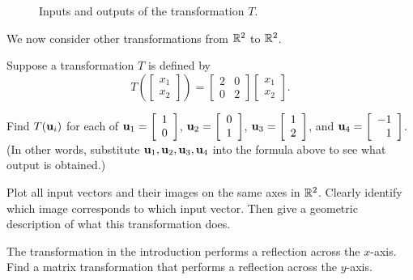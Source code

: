\begin{figure}[ht]
\begin{center}
\resizebox{!}{3.0in}{\texttt{[image: 1g\_pa1\_b]}}
\caption{Inputs and outputs of the transformation $T$.}
\label{F:PA_1g_1}
\end{center}
\end{figure}	

\begin{pa} \label{pa:1_g} We now consider other transformations from $\mathbb{R}^2$ to $\mathbb{R}^2$. 

\be	
\item Suppose a transformation $T$ is defined by 
\[T\left( \left[ \begin{array}{c}  x_1\\x_2 \end{array} \right] \right) = \left[ \begin{array}{cc} 2&0 \\ 0&2 \end{array} \right] \left[ \begin{array}{c}  x_1 \\ x_2 \end{array} \right].\]
	\ba
	\item Find $T(\mathbf{u}_i)$ for each of $\mathbf{u}_1 = \left[ \begin{array}{c}  1 \\ 0 \end{array} \right]$, $\mathbf{u}_2 = \left[ \begin{array}{c}  0\\1 \end{array} \right]$, $\mathbf{u}_3 = \left[ \begin{array}{c} 1  \\ 2 \end{array} \right]$, and  $\mathbf{u}_4 = \left[ \begin{array}{r} -1  \\ 1 \end{array} \right]$. (In other words, substitute $\mathbf{u}_1, \mathbf{u}_2, \mathbf{u}_3, \mathbf{u}_4$ into the formula above to see what output is obtained.)

	\item Plot all input vectors and their images on the same axes in $\mathbb{R}^2$. Clearly identify which image corresponds to which input vector. Then give a geometric description of what this transformation does. 


	\ea
	
\item The transformation in the introduction performs a reflection across the $x$-axis. Find a matrix transformation that performs a reflection across the $y$-axis.


\end{pa}
